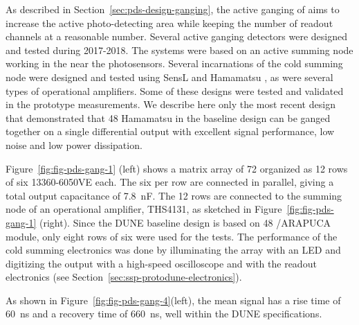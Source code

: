 As described in Section~\ref{sec:pds-design-ganging}, the active ganging of  aims to increase the active photo-detecting area while keeping the number of readout channels at a reasonable number. 
Several active ganging detectors were designed and tested during 2017-2018. 
The systems were based on an active summing node working in the \lar near the photosensors. Several incarnations of the cold summing node were designed and tested using SensL and Hamamatsu , 
as were several types of operational amplifiers.
Some of these designs were tested and validated in the  prototype measurements.
We describe here only the most recent design that demonstrated that 48 Hamamatsu  in the baseline design can be ganged together on a single differential output with excellent signal performance, low noise and low power dissipation.

Figure~\ref{fig:fig-pds-gang-1} (left) shows a matrix array of 72  organized as 12 rows of six  13360-6050VE  each. 
The six  per row are connected in parallel, giving a total output capacitance of \SI{7.8}{nF}. The 12 rows are connected to the summing node of an operational amplifier, THS4131, as sketched in Figure~\ref{fig:fig-pds-gang-1} (right). 
Since the DUNE baseline design is based on 48 /ARAPUCA module, only eight rows of six were used for the tests. 
The performance of the cold summing electronics was done by illuminating the  array with an LED and digitizing the output with a high-speed oscilloscope and with the  readout electronics (see Section~\ref{sec:ssp-protodune-electronics}).

As shown in Figure~\ref{fig:fig-pds-gang-4}(left), the mean signal has a rise time of \SI{60}{ns} and a recovery time of \SI{660}{ns}, well within the DUNE  specifications.

